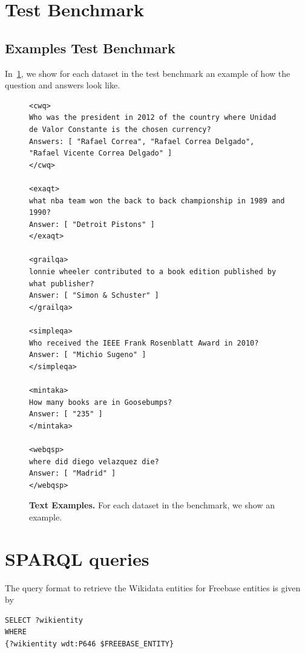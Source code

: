 \documentclass[11pt]{article}
\begin{document}
\section{Test Benchmark}\label{app:test-benchmark}


\subsection{Examples Test Benchmark}\label{app:test-examples}
In~\cref{fig:test-examples}, we show for each dataset in the test benchmark an example of how the question and answers look like.

\begin{figure}[t]
\centering
\begin{tcolorbox}[title=Benchmark Test Examples, promptstyle]
\lstset{
    basicstyle=\normalfont\sffamily\scriptsize,
    breaklines=true,
    frame=none,
    columns=fullflexible,
}
\begin{lstlisting}[linewidth=\linewidth]
<cwq>
Who was the president in 2012 of the country where Unidad de Valor Constante is the chosen currency?
Answers: [ "Rafael Correa", "Rafael Correa Delgado", "Rafael Vicente Correa Delgado" ]
</cwq>

<exaqt>
what nba team won the back to back championship in 1989 and 1990?
Answer: [ "Detroit Pistons" ]
</exaqt>

<grailqa>
lonnie wheeler contributed to a book edition published by what publisher?
Answer: [ "Simon & Schuster" ]
</grailqa>

<simpleqa>
Who received the IEEE Frank Rosenblatt Award in 2010?
Answer: [ "Michio Sugeno" ]
</simpleqa>

<mintaka>
How many books are in Goosebumps?
Answer: [ "235" ]
</mintaka>

<webqsp>
where did diego velazquez die?
Answer: [ "Madrid" ]
</webqsp>
\end{lstlisting}
\end{tcolorbox}
    \caption{\textbf{Text Examples.} For each dataset in the benchmark, we show an example.}
    \label{fig:test-examples}
\end{figure}


\section{SPARQL queries}\label{app:sparql}
The query format to retrieve the Wikidata entities for Freebase entities is given by

\begin{framed}
\begin{Verbatim}[fontsize=\small]
SELECT ?wikientity 
WHERE
{?wikientity wdt:P646 $FREEBASE_ENTITY}
\end{Verbatim}
\end{framed}
\end{document}
